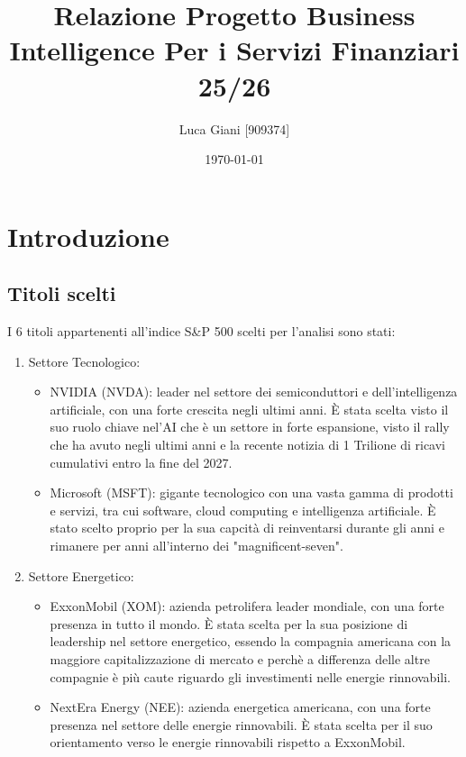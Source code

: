 \documentclass[11pt, a4paper]{report} %
\title{Relazione Progetto Business Intelligence Per i Servizi Finanziari 25/26}
\author{Luca Giani [909374]}
\date{\today}
\begin{document}
\maketitle %
\tableofcontents %

\chapter{Introduzione}

\section{Titoli scelti}

I 6 titoli appartenenti all'indice S\&P 500 scelti per l'analisi sono stati:
\begin{enumerate}
    \item Settore Tecnologico: 
    \begin{itemize}
        \item NVIDIA (NVDA): leader nel settore dei semiconduttori e dell'intelligenza artificiale, con una forte crescita negli ultimi anni. È stata scelta visto il suo ruolo chiave nel'AI che è un settore in forte espansione, visto il rally che ha avuto negli ultimi anni e la recente notizia di 1 Trilione di ricavi cumulativi entro la fine del 2027.
        \item Microsoft (MSFT): gigante tecnologico con una vasta gamma di prodotti e servizi, tra cui software, cloud computing e intelligenza artificiale. È stato scelto proprio per la sua capcità di reinventarsi durante gli anni e rimanere per anni all'interno dei "magnificent-seven".
    \end{itemize}
        
    \item Settore Energetico: 
    \begin{itemize}
        \item ExxonMobil (XOM): azienda petrolifera leader mondiale, con una forte presenza in tutto il mondo. È stata scelta per la sua posizione di leadership nel settore energetico, essendo la compagnia americana con la maggiore capitalizzazione di mercato e perchè a differenza delle altre compagnie è più caute riguardo gli investimenti nelle energie rinnovabili.
        \item NextEra Energy (NEE): azienda energetica americana, con una forte presenza nel settore delle energie rinnovabili. È stata scelta per il suo orientamento verso le energie rinnovabili rispetto a ExxonMobil. 
    \end{itemize}


\end{enumerate}
\end{document}
